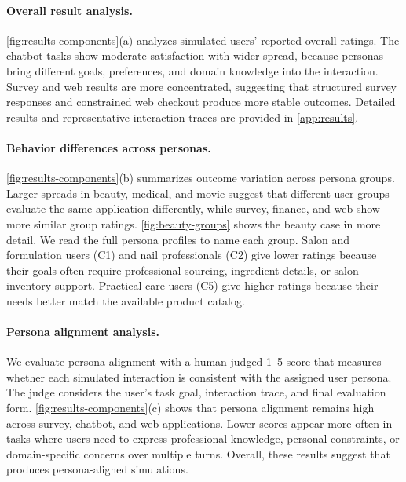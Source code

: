 \paragraph{Overall result analysis.}
\autoref{fig:results-components}(a) analyzes simulated users' reported overall ratings. The chatbot tasks show moderate satisfaction with wider spread, because personas bring different goals, preferences, and domain knowledge into the interaction. Survey and web results are more concentrated, suggesting that structured survey responses and constrained web checkout produce more stable outcomes. Detailed results and representative interaction traces are provided in \autoref{app:results}.

\paragraph{Behavior differences across personas.}
\autoref{fig:results-components}(b) summarizes outcome variation across persona groups. Larger spreads in beauty, medical, and movie suggest that different user groups evaluate the same application differently, while survey, finance, and web show more similar group ratings. \autoref{fig:beauty-groups} shows the beauty case in more detail. We read the full persona profiles to name each group. Salon and formulation users (C1) and nail professionals (C2) give lower ratings because their goals often require professional sourcing, ingredient details, or salon inventory support. Practical care users (C5) give higher ratings because their needs better match the available product catalog.

\paragraph{Persona alignment analysis.}
We evaluate persona alignment with a human-judged 1--5 score that measures whether each simulated interaction is consistent with the assigned user persona. The judge considers the user's task goal, interaction trace, and final evaluation form. \autoref{fig:results-components}(c) shows that persona alignment remains high across survey, chatbot, and web applications. Lower scores appear more often in tasks where users need to express professional knowledge, personal constraints, or domain-specific concerns over multiple turns. Overall, these results suggest that \method produces persona-aligned simulations.

